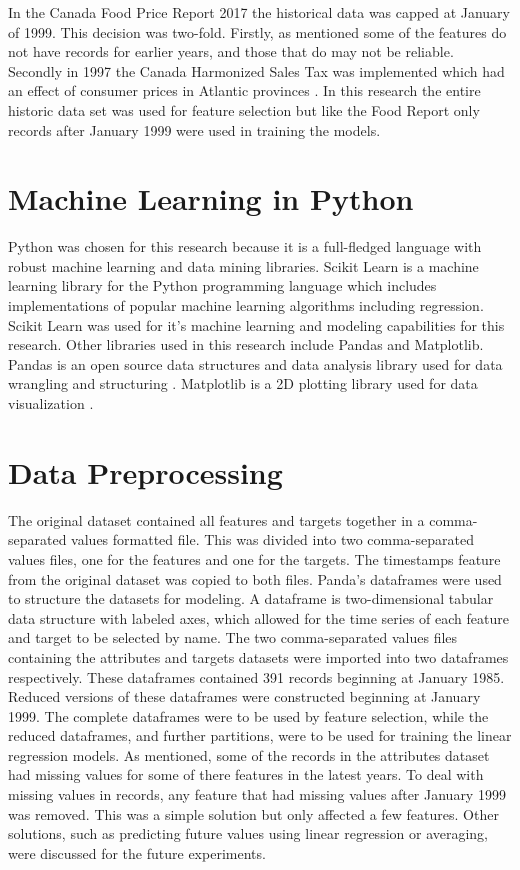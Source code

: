 \documentclass[12pt]{dalthesis}
\begin{document}
In the Canada Food Price Report 2017 the historical data was capped at January of 1999. This decision was two-fold. Firstly, as mentioned some of the features do not have records for earlier years, and those that do may not be reliable. Secondly in 1997 the Canada Harmonized Sales Tax was implemented which had an effect of consumer prices in Atlantic provinces \cite{jay}. In this research the entire historic data set was used for feature selection but like the Food Report only records after January 1999 were used in training the models.  

\section{Machine Learning in Python}
Python was chosen for this research because it is a full-fledged language with robust machine learning and data mining libraries. Scikit Learn is a machine learning library for the Python programming language which includes implementations of popular machine learning algorithms including regression. Scikit Learn was used for it’s machine learning and modeling capabilities for this research. Other libraries used in this research include Pandas and Matplotlib. Pandas is an open source data structures and data analysis library used for data wrangling and structuring \cite{pandas}. Matplotlib is a 2D plotting library used for data visualization \cite{matplot}. 


\section{Data Preprocessing}
The original dataset contained all features and targets together in a comma-separated values formatted file. This was divided into two comma-separated values files, one for the features and one for the targets. The timestamps feature from the original dataset was copied to both files. Panda’s dataframes were used to structure the datasets for modeling. A dataframe is two-dimensional tabular data structure with labeled axes, which allowed for the time series of each feature and target to be selected by name.\cite{pandas} The two comma-separated values files containing the attributes and targets datasets were imported into two dataframes respectively. These dataframes contained 391 records beginning at January 1985. Reduced versions of these dataframes were constructed beginning at January 1999. The complete dataframes were to be used by feature selection, while the reduced dataframes,  and further partitions, were to be used for training the linear regression models.  As mentioned, some of the records in the attributes dataset had missing values for some of there features in the latest years. To deal with missing values in records, any feature that had missing values after January 1999 was removed. This was a simple solution but only affected a few features. Other solutions, such as predicting future values using linear regression or averaging, were discussed for the future experiments.  \\
\end{document}
